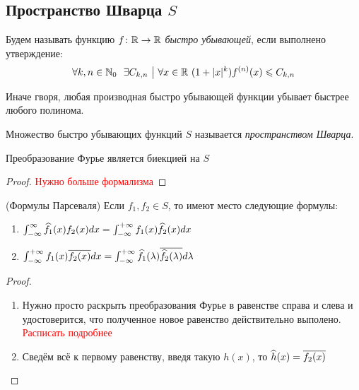 \subsection{Пространство Шварца $S$}

\begin{definition}
	Будем называть функцию $f \colon \mathbb{R} \to \mathbb{R}$ \textit{быстро убывающей}, если выполнено утверждение:
	\[
		\forall k, n \in \mathbb{N}_0\ \ \exists C_{k, n} \ \big|\  \forall x \in \mathbb{R}\ (1 + |x|^k)f^{(n)}(x) \leqslant C_{k, n}
	\]
\end{definition}

\begin{anote}
	Иначе гворя, любая производная быстро убывающей функции убывает быстрее любого полинома.
\end{anote}

\begin{definition}
	Множество быстро убывающих функций $S$ называется \textit{пространством Шварца}.
\end{definition}

\begin{theorem}
	Преобразование Фурье является биекцией на $S$
\end{theorem}

\begin{proof}
	\textcolor{red}{Нужно больше формализма}
\end{proof}

\begin{theorem} (Формулы Парсеваля)
	Если $f_1, f_2 \in S$, то имеют место следующие формулы:
	\begin{enumerate}
		\item \(\int_{-\infty}^\infty \widehat{f}_1(x)f_2(x)dx = \int_{-\infty}^{+\infty} f_1(x)\widehat{f}_2(x)dx\)
		
		\item \(\int_{-\infty}^{+\infty} f_1(x)\overline{f_2(x)}dx = \int_{-\infty}^{+\infty} \widehat{f}_1(\lambda)\overline{\widehat{f}_2(\lambda)}d\lambda\)
	\end{enumerate}
\end{theorem}

\begin{proof}~
	\begin{enumerate}
		\item Нужно просто раскрыть преобразования Фурье в равенстве справа и слева и удостоверится, что полученное новое равенство действительно выполено. \textcolor{red}{Расписать подробнее}
		
		\item Сведём всё к первому равенству, введя такую $h(x)$, то $\widehat{h}(x) = \overline{f_2(x)}$
	\end{enumerate}
\end{proof}